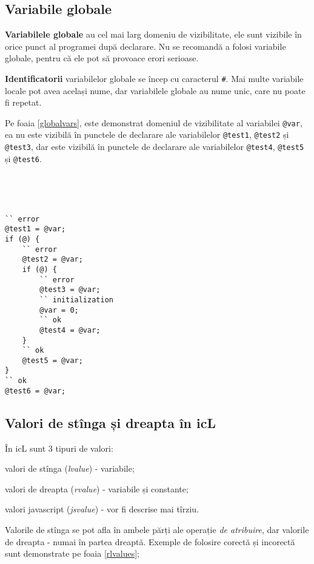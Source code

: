 \subsection{Variabile globale}

\textbf{Variabilele globale} au cel mai larg domeniu de vizibilitate, ele sunt vizibile în orice punct al programei după declarare. Nu se recomandă a folosi variabile globale, pentru că ele pot să provoace erori serioase.

{\bf Identificatorii} variabilelor globale se încep cu caracterul {\color{blue2}\lstinline|#|}. Mai multe variabile locale pot avea același nume, dar variabilele globale au nume unic, care nu poate fi repetat.

Pe foaia \ref{globalvars}, este demonstrat domeniul de vizibilitate al variabilei \lstinline|@var|, ea nu este vizibilă în punctele de declarare ale variabilelor \lstinline|@test1|, \lstinline|@test2| și \lstinline|@test3|, dar este vizibilă în punctele de declarare ale variabilelor \lstinline|@test4|, \lstinline|@test5| și \lstinline|@test6|.

\

\

\begin{lstlisting}[caption=Domeniu de vizibilitate al variabilei globale, label=globalvars]
`` error
@test1 = @var;
if (@) {
	`` error
	@test2 = @var;
	if (@) {
		`` error
		@test3 = @var;
		`` initialization
		@var = 0;
		`` ok
		@test4 = @var;
	}
	`` ok
	@test5 = @var;
}
`` ok
@test6 = @var;
\end{lstlisting}

\subsection{Valori de stînga și dreapta în icL}

În icL sunt 3 tipuri de valori:

\begin{icEnum}
\item
	valori de stînga ({\it lvalue}) - variabile;
\item
	valori de dreapta ({\it rvalue}) - variabile și constante;
\item
	valori javascript ({\it jsvalue}) - vor fi descrise mai tîrziu.
\end{icEnum}

Valorile de stînga se pot afla în ambele părți ale operație {\it de atribuire}, dar valorile de dreapta - numai în partea dreaptă. Exemple de folosire corectă și incorectă sunt demonstrate pe foaia \ref{rlvalues};

